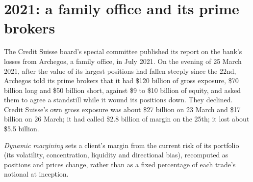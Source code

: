 \begin{omfigure}
\par
{}\label{fig:fm:case-studies-ii:knight}
\end{omfigure}

\section{2021: a family office and its prime brokers}

The Credit Suisse board's special committee published its report on the bank's losses from Archegos, a family office, in July 2021. On the evening of
25 March 2021, after the value of its largest positions had fallen steeply since the 22nd, Archegos told its prime brokers that it had \$120 billion of gross
exposure, \$70 billion long and \$50 billion short, against \$9 to \$10 billion of equity, and asked them to agree a standstill while it wound its
positions down. They declined. Credit Suisse's own gross exposure was about \$27 billion on 23 March and \$17 billion on 26 March; it had called \$2.8
billion of margin on the 25th; it lost about \$5.5 billion.

\begin{definition}\label{def:fm:case-studies-ii:dynamic}
\emph{Dynamic margining} sets a client's margin from the current risk of its portfolio (its volatility, concentration,
liquidity and directional bias), recomputed as positions and prices change, rather than as a fixed percentage of each trade's notional at inception.
\end{definition}

